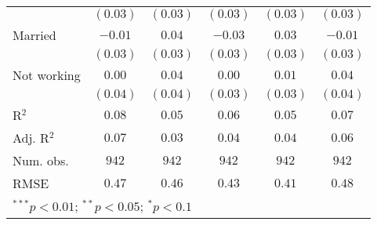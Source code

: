 \begin{table}
\begin{center}
\begin{tabular}{l c c c c c}
              & $(0.03)$      & $(0.03)$      & $(0.03)$      & $(0.03)$      & $(0.03)$      \\
Married       & $-0.01$       & $0.04$        & $-0.03$       & $0.03$        & $-0.01$       \\
              & $(0.03)$      & $(0.03)$      & $(0.03)$      & $(0.03)$      & $(0.03)$      \\
Not working   & $0.00$        & $0.04$        & $0.00$        & $0.01$        & $0.04$        \\
              & $(0.04)$      & $(0.04)$      & $(0.03)$      & $(0.03)$      & $(0.04)$      \\
\midrule
R$^2$         & $0.08$        & $0.05$        & $0.06$        & $0.05$        & $0.07$        \\
Adj. R$^2$    & $0.07$        & $0.03$        & $0.04$        & $0.04$        & $0.06$        \\
Num. obs.     & $942$         & $942$         & $942$         & $942$         & $942$         \\
RMSE          & $0.47$        & $0.46$        & $0.43$        & $0.41$        & $0.48$        \\
\bottomrule
\multicolumn{6}{l}{\scriptsize{$^{***}p<0.01$; $^{**}p<0.05$; $^{*}p<0.1$}}
\end{tabular}
\label{tab_emo_week}
\end{center}
\end{table}
